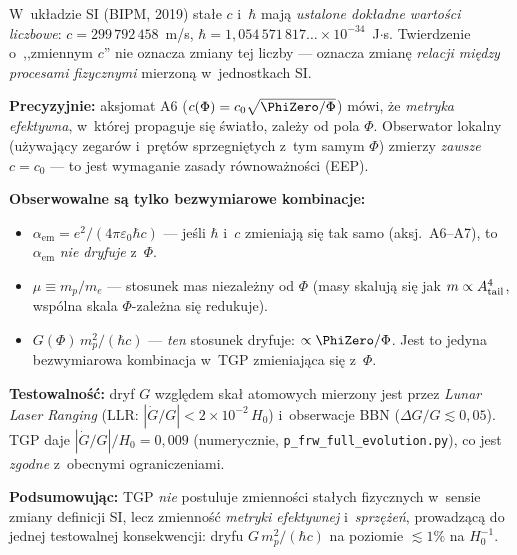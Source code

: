 \begin{remark}\label{rem:SI-constants}
W~uk\l{}adzie SI (BIPM, 2019) sta\l{}e $c$ i~$\hbar$ maj\k{a}
\emph{ustalone dok\l{}adne warto\'sci liczbowe}: $c = 299\,792\,458$~m/s,
$\hbar = 1{,}054\,571\,817\ldots \times 10^{-34}$~J$\cdot$s.
Twierdzenie o~,,zmiennym $c$'' nie oznacza zmiany tej liczby
--- oznacza zmian\k{e} \emph{relacji mi\k{e}dzy procesami fizycznymi}
mierzon\k{a} w~jednostkach SI.

\medskip\noindent
\textbf{Precyzyjnie:} aksjomat A6 ($c(\Phi) = c_0\sqrt{\PhiZero/\Phi}$)
m\'owi, \.ze \emph{metryka efektywna}, w~kt\'orej propaguje si\k{e}
\'swiat\l{}o, zale\.zy od pola $\Phi$. Obserwator lokalny
(u\.zywaj\k{a}cy zegar\'ow i~pr\k{e}t\'ow sprzegni\k{e}tych
z~tym samym $\Phi$) zmierzy \emph{zawsze} $c = c_0$
--- to jest wymaganie zasady r\'ownowa\.zno\'sci (EEP).

\medskip\noindent
\textbf{Obserwowalne s\k{a} tylko bezwymiarowe kombinacje:}
\begin{itemize}[nosep]
  \item $\alpha_{\mathrm{em}} = e^2/(4\pi\varepsilon_0 \hbar c)$
    --- je\'sli $\hbar$ i~$c$ zmieniaj\k{a} si\k{e} tak samo
    (aksj.~A6--A7), to $\alpha_{\mathrm{em}}$
    \emph{nie dryfuje} z~$\Phi$.
  \item $\mu \equiv m_p/m_e$ --- stosunek mas niezale\.zny od $\Phi$
    (masy skaluj\k{a} si\k{e} jak $m \propto A_{\rm tail}^4$,
    wsp\'olna skala $\Phi$-zale\.zna si\k{e} redukuje).
  \item $G(\Phi)\,m_p^2/(\hbar c)$ --- \emph{ten} stosunek dryfuje:
    $\propto \PhiZero/\Phi$. Jest to jedyna bezwymiarowa kombinacja
    w~TGP zmieniaj\k{a}ca si\k{e} z~$\Phi$.
\end{itemize}

\medskip\noindent
\textbf{Testowalno\'s\'c:}
dryf $G$ wzgl\k{e}dem ska\l{} atomowych mierzony jest przez
\emph{Lunar Laser Ranging} (LLR: $|\dot G/G| < 2 \times 10^{-2}\,H_0$)
i~obserwacje BBN ($\Delta G/G \lesssim 0{,}05$).
TGP daje $|\dot G/G|/H_0 = 0{,}009$ (numerycznie,
\texttt{p\_frw\_full\_evolution.py}), co jest \emph{zgodne}
z~obecnymi ograniczeniami.

\medskip\noindent
\textbf{Podsumowuj\k{a}c:} TGP \emph{nie} postuluje zmienno\'sci
sta\l{}ych fizycznych w~sensie zmiany definicji SI,
lecz zmienno\'s\'c \emph{metryki efektywnej} i~\emph{sprz\k{e}\.ze\'n},
prowadz\k{a}c\k{a} do jednej testowalnej konsekwencji:
dryfu $G\,m_p^2/(\hbar c)$ na poziomie $\lesssim 1\%$ na $H_0^{-1}$.
\end{remark}

